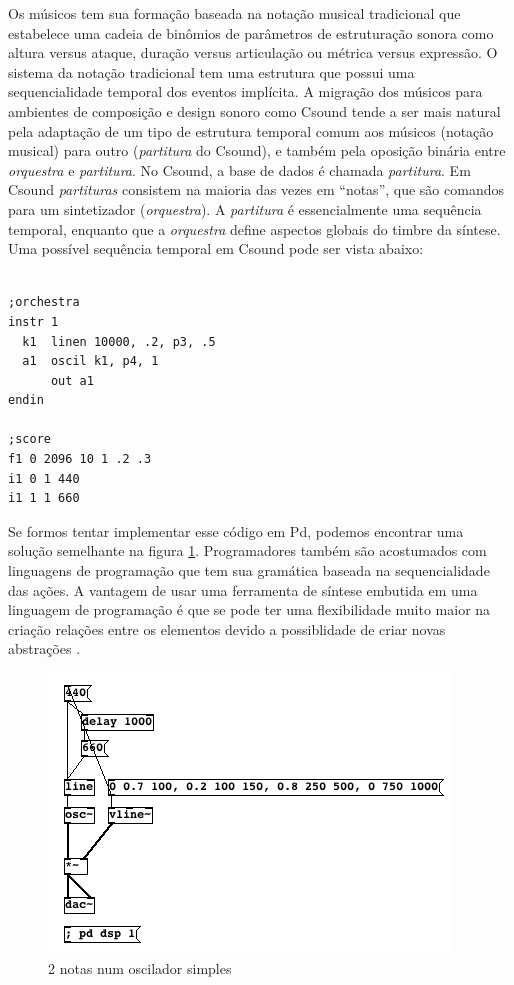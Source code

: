 \documentclass{ppgmus}
\begin{document}
Os músicos tem sua formação baseada na notação musical tradicional que
estabelece uma cadeia de binômios de parâmetros de estruturação sonora
\cite{zampronha00:notacao} como altura versus ataque, duração versus
articulação ou métrica versus expressão. O sistema da notação
tradicional tem uma estrutura que possui uma sequencialidade temporal
dos eventos implícita. A migração dos músicos para ambientes de
composição e design sonoro como Csound \cite{boulanger00:csound} tende
a ser mais natural pela adaptação de um tipo de estrutura temporal comum aos músicos
(notação musical) para outro (\textit{partitura} do Csound), e também pela oposição binária entre
\textit{orquestra} e \textit{partitura}. 
No Csound, a base de dados é chamada
\textit{partitura}. Em Csound \textit{partituras} consistem na maioria das vezes em
``notas'', que são comandos para um sintetizador (\textit{orquestra}). A \textit{partitura}
é essencialmente uma sequência temporal, enquanto que a \textit{orquestra}
define aspectos globais do timbre da síntese. Uma possível sequência
temporal em Csound pode ser vista abaixo:

\singlespacing
\footnotesize
\begin{verbatim}

;orchestra
instr 1
  k1  linen 10000, .2, p3, .5
  a1  oscil k1, p4, 1
      out a1
endin

;score
f1 0 2096 10 1 .2 .3
i1 0 1 440
i1 1 1 660
\end{verbatim}
\normalsize
\doublespacing 

Se formos tentar implementar esse código em Pd, podemos encontrar uma 
solução semelhante na figura \ref{fig:exemplopd1}.
Programadores também são acostumados com linguagens de programação que
tem sua gramática baseada na sequencialidade das ações. A vantagem de
usar uma ferramenta de síntese embutida em uma linguagem de
programação é que se pode ter uma flexibilidade muito maior na criação
relações entre os elementos devido a possiblidade de criar novas
abstrações \cite{geiger2005}. 
 
\begin{figure}
  \centering
  \includegraphics[scale=.5]{exemplopd1}
  \caption{2 notas num oscilador simples}
  \label{fig:exemplopd1}
\end{figure}
\end{document}
